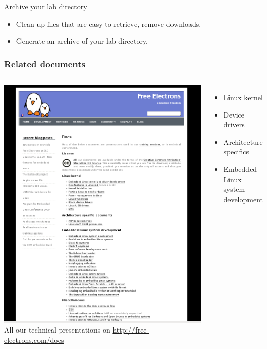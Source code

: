 \setuplabframe
{Archive your lab directory}
{
  \begin{itemize}
  \item Clean up files that are easy to retrieve, remove downloads.
  \item Generate an archive of your lab directory.
  \end{itemize}
}


\begin{frame}
  \frametitle{Related documents}
  \begin{columns}
    \includegraphics[width=\textwidth]{slides/last-slides/related-documents-screenshot.png}
    All our technical presentations on \url{http://free-electrons.com/docs}
    \begin{itemize}
    \item Linux kernel
    \item Device drivers
    \item Architecture specifics
    \item Embedded Linux system development
    \end{itemize}
  \end{columns}
\end{frame}


